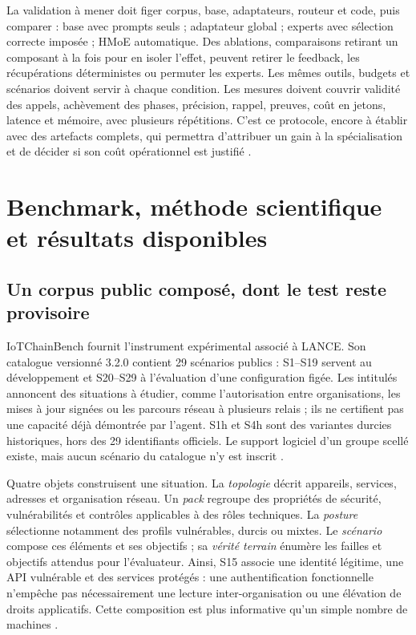 \documentclass[11pt,a4paper]{article}
\begin{document}
La validation à mener doit figer corpus, base, adaptateurs, routeur et code,
puis comparer : base avec prompts seuls ; adaptateur global ; experts avec
sélection correcte imposée ; HMoE automatique. Des ablations, comparaisons retirant un composant à la fois pour en isoler
l'effet, peuvent retirer le
feedback, les récupérations déterministes ou permuter les experts. Les mêmes
outils, budgets et scénarios doivent servir à chaque condition. Les mesures
doivent couvrir validité des appels, achèvement des phases, précision, rappel,
preuves, coût en jetons, latence et mémoire, avec plusieurs répétitions. C'est
ce protocole, encore à établir avec des artefacts complets, qui permettra
d'attribuer un gain à la spécialisation et de décider si son coût opérationnel
est justifié \cite{ml-memoire}.


\section{Benchmark, méthode scientifique et résultats disponibles}
\label{sec:bench-bilan}

\subsection{Un corpus public composé, dont le test reste provisoire}

IoTChainBench fournit l'instrument expérimental associé à LANCE. Son catalogue
versionné 3.2.0 contient 29 scénarios publics : S1--S19 servent au développement
et S20--S29 à l'évaluation d'une configuration figée. Les intitulés annoncent
des situations à étudier, comme l'autorisation entre organisations, les mises
à jour signées ou les parcours réseau à plusieurs relais ; ils ne certifient
pas une capacité déjà démontrée par l'agent. S1h et S4h sont des variantes
durcies historiques, hors des 29 identifiants officiels. Le support logiciel
d'un groupe scellé existe, mais aucun scénario du catalogue n'y est inscrit
\cite{net-catalog,net-scenarios}.

Quatre objets construisent une situation. La \emph{topologie} décrit appareils,
services, adresses et organisation réseau. Un \emph{pack} regroupe des propriétés
de sécurité, vulnérabilités et contrôles applicables à des rôles techniques.
La \emph{posture} sélectionne notamment des profils vulnérables, durcis ou mixtes.
Le \emph{scénario} compose ces éléments et ses objectifs ; sa \emph{vérité terrain}
énumère les failles et objectifs attendus pour l'évaluateur. Ainsi, S15 associe
une identité légitime, une API vulnérable et des services protégés : une
authentification fonctionnelle n'empêche pas nécessairement une lecture
inter-organisation ou une élévation de droits applicatifs. Cette composition
est plus informative qu'un simple nombre de machines \cite{bench-composition}.
\end{document}
